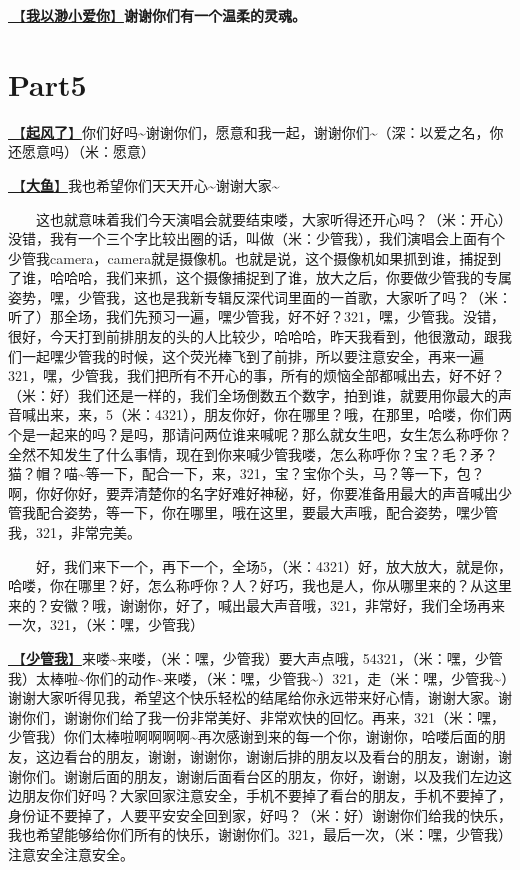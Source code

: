 \documentclass[]{ctexbook}
\begin{document}
\hyperref[loving-you-in-my-humble-way]{🎵【\textbf{我以渺小爱你}】}\textbf{谢谢你们有一个温柔的灵魂。}

\section{Part5}\label{shanghai-20240519-part5}

\hyperref[the-wind-rises]{🎵【\textbf{起风了}】}你们好吗\textasciitilde 谢谢你们，愿意和我一起，谢谢你们\textasciitilde（深：以爱之名，你还愿意吗）（米：愿意）

\hyperref[big-fish]{🎵【\textbf{大鱼}】}我也希望你们天天开心\textasciitilde 谢谢大家\textasciitilde{}

  这也就意味着我们今天演唱会就要结束喽，大家听得还开心吗？（米：开心）没错，我有一个三个字比较出圈的话，叫做（米：少管我），我们演唱会上面有个少管我camera，camera就是摄像机。也就是说，这个摄像机如果抓到谁，捕捉到了谁，哈哈哈，我们来抓，这个摄像捕捉到了谁，放大之后，你要做少管我的专属姿势，嘿，少管我，这也是我新专辑反深代词里面的一首歌，大家听了吗？（米：听了）那全场，我们先预习一遍，嘿少管我，好不好？321，嘿，少管我。没错，很好，今天打到前排朋友的头的人比较少，哈哈哈，昨天我看到，他很激动，跟我们一起嘿少管我的时候，这个荧光棒飞到了前排，所以要注意安全，再来一遍321，嘿，少管我，我们把所有不开心的事，所有的烦恼全部都喊出去，好不好？（米：好）我们还是一样的，我们全场倒数五个数字，拍到谁，就要用你最大的声音喊出来，来，5（米：4321），朋友你好，你在哪里？哦，在那里，哈喽，你们两个是一起来的吗？是吗，那请问两位谁来喊呢？那么就女生吧，女生怎么称呼你？全然不知发生了什么事情，现在到你来喊少管我喽，怎么称呼你？宝？毛？矛？猫？帽？喵\textasciitilde 等一下，配合一下，来，321，宝？宝你个头，马？等一下，包？啊，你好你好，要弄清楚你的名字好难好神秘，好，你要准备用最大的声音喊出少管我配合姿势，等一下，你在哪里，哦在这里，要最大声哦，配合姿势，嘿少管我，321，非常完美。

  好，我们来下一个，再下一个，全场5，（米：4321）好，放大放大，就是你，哈喽，你在哪里？好，怎么称呼你？人？好巧，我也是人，你从哪里来的？从这里来的？安徽？哦，谢谢你，好了，喊出最大声音哦，321，非常好，我们全场再来一次，321，（米：嘿，少管我）

\hyperref[watch-ur-manners]{🎵【\textbf{少管我}】}来喽\textasciitilde 来喽，（米：嘿，少管我）要大声点哦，54321，（米：嘿，少管我）太棒啦\textasciitilde 你们的动作\textasciitilde 来喽，（米：嘿，少管我\textasciitilde）321，走（米：嘿，少管我\textasciitilde）谢谢大家听得见我，希望这个快乐轻松的结尾给你永远带来好心情，谢谢大家。谢谢你们，谢谢你们给了我一份非常美好、非常欢快的回忆。再来，321（米：嘿，少管我）你们太棒啦啊啊啊啊\textasciitilde 再次感谢到来的每一个你，谢谢你，哈喽后面的朋友，这边看台的朋友，谢谢，谢谢你，谢谢后排的朋友以及看台的朋友，谢谢，谢谢你们。谢谢后面的朋友，谢谢后面看台区的朋友，你好，谢谢，以及我们左边这边朋友你们好吗？大家回家注意安全，手机不要掉了看台的朋友，手机不要掉了，身份证不要掉了，人要平安安全回到家，好吗？（米：好）谢谢你们给我的快乐，我也希望能够给你们所有的快乐，谢谢你们。321，最后一次，（米：嘿，少管我）注意安全注意安全。
\end{document}
